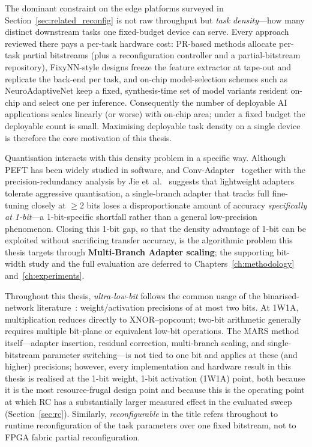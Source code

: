 \documentclass[12pt, a4paper]{report}
\numberwithin{equation}{chapter}
\numberwithin{figure}{chapter}
\numberwithin{table}{chapter}
\numberwithin{algorithm}{chapter}
\begin{document}
The dominant constraint on the edge platforms surveyed in Section~\ref{sec:related_reconfig} is not raw throughput but \emph{task density}---how many distinct downstream tasks one fixed-budget device can serve. Every approach reviewed there pays a per-task hardware cost: PR-based methods allocate per-task partial bitstreams (plus a reconfiguration controller and a partial-bitstream repository), FixyNN-style designs freeze the feature extractor at tape-out and replicate the back-end per task, and on-chip model-selection schemes such as NeuroAdaptiveNet keep a fixed, synthesis-time set of model variants resident on-chip and select one per inference. Consequently the number of deployable AI applications scales linearly (or worse) with on-chip area; under a fixed budget the deployable count is small. Maximising deployable task density on a single device is therefore the core motivation of this thesis.

Quantisation interacts with this density problem in a specific way. Although PEFT has been widely studied in software, and Conv-Adapter~\cite{Chen2024ConvAdapter} together with the precision-redundancy analysis by Jie et~al.~\cite{Jie2023PrecisionRedundancy} suggests that lightweight adapters tolerate aggressive quantisation, a single-branch adapter that tracks full fine-tuning closely at $\geq$2 bits loses a disproportionate amount of accuracy \emph{specifically at 1-bit}---a 1-bit-specific shortfall rather than a general low-precision phenomenon. Closing this 1-bit gap, so that the density advantage of 1-bit can be exploited without sacrificing transfer accuracy, is the algorithmic problem this thesis targets through \textbf{Multi-Branch Adapter scaling}; the supporting bit-width study and the full evaluation are deferred to Chapters~\ref{ch:methodology} and~\ref{ch:experiments}.

Throughout this thesis, \emph{ultra-low-bit} follows the common usage of the binarised-network literature~\cite{Hubara2016BinarizedNN,Qin2020BNNSurvey}: weight/activation precisions of at most two bits. At 1W1A, multiplication reduces directly to XNOR--popcount; two-bit arithmetic generally requires multiple bit-plane or equivalent low-bit operations. The MARS method itself---adapter insertion, residual correction, multi-branch scaling, and single-bitstream parameter switching---is not tied to one bit and applies at these (and higher) precisions; however, every implementation and hardware result in this thesis is realised at the 1-bit weight, 1-bit activation (1W1A) point, both because it is the most resource-frugal design point and because this is the operating point at which RC has a substantially larger measured effect in the evaluated sweep (Section~\ref{sec:rc}). Similarly, \emph{reconfigurable} in the title refers throughout to runtime reconfiguration of the task parameters over one fixed bitstream, not to FPGA fabric partial reconfiguration.
\end{document}
